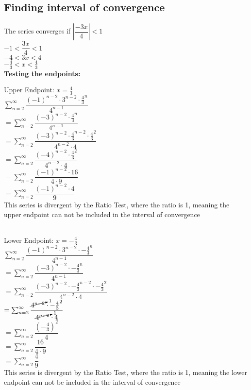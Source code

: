 \documentclass{article}
\begin{document}
\subsection*{Finding interval of convergence}
The series converges if $\left|   \dfrac{-3x}{4} \right| < 1$
\\[0.1in] $-1< \dfrac{3x}{4} < 1$
\\[0.1in] $-4< 3x < 4$
\\[0.1in] $-\frac{4}{3}< x < \frac{4}{3}$
\\[0.1in]\textbf{Testing the endpoints:}
\begin{multicols*}{2}
    Upper Endpoint: $x=\frac{4}{3}$
    \\[0.05in]$ \sum_{n=2}^{\infty}\dfrac{(-1)^{n-2}\cdot3^{n-2}\cdot \frac{4}{3}^{n}}{4^{n-1}}$
    \\[0.05in]$ =\sum_{n=2}^{\infty}\dfrac{(-3)^{n-2}\cdot \frac{4}{3}^{n}}{4^{n-1}}$
    \\[0.05in]$ =\sum_{n=2}^{\infty}\dfrac{(-3)^{n-2}\cdot \frac{4}{3}^{n-2} \cdot \frac{4}{3}^2}{4^{n-2}\cdot4}$
    \\[0.05in]$ =\sum_{n=2}^{\infty}\dfrac{(-4)^{n-2}\cdot \frac{4}{3}^2}{4^{n-2}\cdot4}$
    \\[0.05in]$ =\sum_{n=2}^{\infty}\dfrac{(-1)^{n-2}\cdot {16}}{4\cdot 9}$
    \\[0.05in]$ =\sum_{n=2}^{\infty}\dfrac{(-1)^{n-2}\cdot {4}}{ 9}$
    \\[0.05in]This series is divergent by the Ratio Test, where the ratio is 1, meaning the upper endpoint can not be included in the interval of convergence
    \\[0.5in]\\
    \vfill\null
    \columnbreak

    Lower Endpoint: $x=-\frac{4}{3}$
    \\[0.05in]$ \sum_{n=2}^{\infty}\dfrac{(-1)^{n-2}\cdot3^{n-2}\cdot -\frac{4}{3}^{n}}{4^{n-1}}$
    \\[0.05in]$ =\sum_{n=2}^{\infty}\dfrac{(-3)^{n-2}\cdot -\frac{4}{3}^{n}}{4^{n-1}}$
    \\[0.05in]$ =\sum_{n=2}^{\infty}\dfrac{(-3)^{n-2}\cdot -\frac{4}{3}^{n-2} \cdot -\frac{4}{3}^2}{4^{n-2}\cdot4}$
    \\[0.05in]$ =\sum_{n=2}^{\infty}\dfrac{\cancelto{1}{4^{n-2}}\cdot -\frac{4}{3}^2}{\cancelto{1}{4^{n-2}}\cdot4}$
    \\[0.05in]$ =\sum_{n=2}^{\infty}\dfrac{\left( -\frac{4}{3}\right)^2}{4}$
    \\[0.05in]$ =\sum_{n=2}^{\infty}\dfrac{16}{4\cdot 9}$
    \\[0.05in]$ =\sum_{n=2}^{\infty}\dfrac{4}{9}$
    \\[0.05in]This series is divergent by the Ratio Test, where the ratio is 1, meaning the lower endpoint can not be included in the interval of convergence
\end{multicols*}
\end{document}
